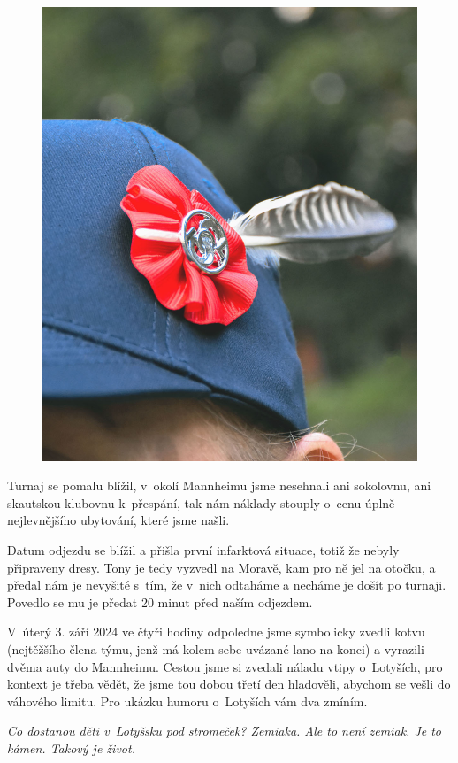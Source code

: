 \documentclass[11pt]{article}
\begin{document}
\begin{figure}
  \includegraphics[width=0.9\linewidth]{./lano-kokarda.jpg}
\end{figure}

Turnaj se pomalu blížil, v~okolí Mannheimu jsme nesehnali ani sokolovnu, ani skautskou klubovnu k~přespání, tak nám náklady stouply o~cenu úplně nejlevnějšího ubytování, které jsme našli.

Datum odjezdu se blížil a přišla první infarktová situace, totiž že nebyly připraveny dresy. Tony je tedy vyzvedl na Moravě, kam pro ně jel na otočku, a předal nám je nevyšité s~tím, že v~nich odtaháme a necháme je došít po turnaji. Povedlo se mu je předat 20 minut před naším odjezdem.

V~úterý 3. září 2024 ve čtyři hodiny odpoledne jsme symbolicky zvedli kotvu (nejtěžšího člena týmu, jenž má kolem sebe uvázané lano na konci) a vyrazili dvěma auty do Mannheimu. Cestou jsme si zvedali náladu vtipy o~Lotyších, pro kontext je třeba vědět, že jsme tou dobou třetí den hladověli, abychom se vešli do váhového limitu. Pro ukázku humoru o~Lotyších vám dva zmíním.

\begin{center}
  \textit{Co dostanou děti v~Lotyšsku pod stromeček? Zemiaka. Ale to není zemiak. Je to kámen. Takový je život.}
\end{center}
\end{document}
